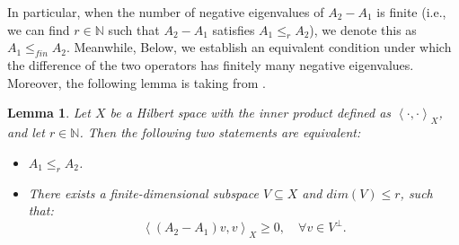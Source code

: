 \documentclass[11pt,reqno,twoside]{amsart}
\newtheorem{lem}{Lemma}[section]
\theoremstyle{definition}
\theoremstyle{remark}
\numberwithin{equation}{section}
\begin{document}
In particular, when the number of negative eigenvalues of $A_2-A_1$ is finite (i.e., we can find $r \in \mathbb N$ such that $A_2-A_1$ satisfies $A_1 \leq_r A_2$), we denote this as $A_1 \leq_{fin} A_2$. Meanwhile, Below, we establish an equivalent condition under which the difference of the two operators has finitely many negative eigenvalues. Moreover, the following lemma is taking from \cite{HPS19b}.
\begin{lem}\label{EquDef}
	Let $X$ be a Hilbert space with the inner product defined as $\left\langle  \cdot , \cdot \right\rangle _X$, and let $r \in \mathbb N$. Then the following two statements are equivalent:
	\begin{itemize}
		\item [(1).] $ A_1 \leq_r A_2 $.
		\item [(2).] There exists a finite-dimensional subspace $V \subseteq X$ and $dim \left( V\right) \leq r$, such that:
		$$
		\left\langle  \left( A_2- A_1\right) v, v \right\rangle _X \geq 0, \quad \forall v \in V^{\perp}.
		$$
	\end{itemize}
\end{lem}
\end{document}
